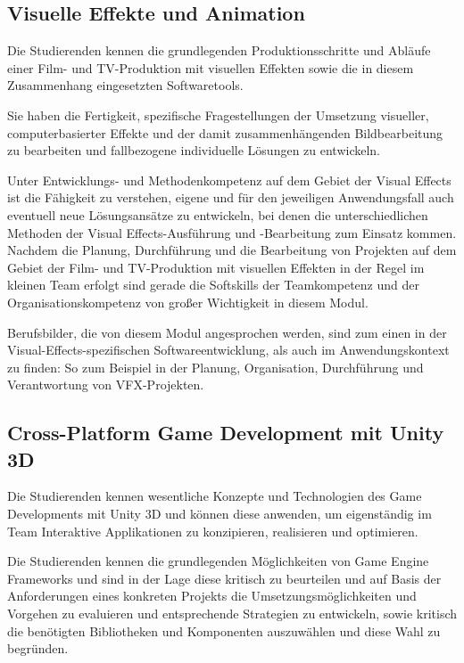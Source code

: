 \subsection*{Visuelle Effekte und
Animation}\label{visuelle-effekte-und-animation}

Die Studierenden kennen die grundlegenden Produktionsschritte und
Abläufe einer Film- und TV-Produktion mit visuellen Effekten sowie die
in diesem Zusammenhang eingesetzten Softwaretools.

Sie haben die Fertigkeit, spezifische Fragestellungen der Umsetzung
visueller, computerbasierter Effekte und der damit zusammenhängenden
Bildbearbeitung zu bearbeiten und fallbezogene individuelle Lösungen zu
entwickeln.

Unter Entwicklungs- und Methodenkompetenz auf dem Gebiet der Visual
Effects ist die Fähigkeit zu verstehen, eigene und für den jeweiligen
Anwendungsfall auch eventuell neue Lösungsansätze zu entwickeln, bei
denen die unterschiedlichen Methoden der Visual Effects-Ausführung und
-Bearbeitung zum Einsatz kommen. Nachdem die Planung, Durchführung und
die Bearbeitung von Projekten auf dem Gebiet der Film- und TV-Produktion
mit visuellen Effekten in der Regel im kleinen Team erfolgt sind gerade
die Softskills der Teamkompetenz und der Organisationskompetenz von
großer Wichtigkeit in diesem Modul.

Berufsbilder, die von diesem Modul angesprochen werden, sind zum einen
in der Visual-Effects-spezifischen Softwareentwicklung, als auch im
Anwendungskontext zu finden: So zum Beispiel in der Planung,
Organisation, Durchführung und Verantwortung von VFX-Projekten.

\subsection*{Cross-Platform Game Development mit Unity
3D}\label{cross-platform-game-development-mit-unity-3d}

Die Studierenden kennen wesentliche Konzepte und Technologien des Game
Developments mit Unity 3D und können diese anwenden, um eigenständig im
Team Interaktive Applikationen zu konzipieren, realisieren und
optimieren.

Die Studierenden kennen die grundlegenden Möglichkeiten von Game Engine
Frameworks und sind in der Lage diese kritisch zu beurteilen und auf
Basis der Anforderungen eines konkreten Projekts die
Umsetzungsmöglichkeiten und Vorgehen zu evaluieren und entsprechende
Strategien zu entwickeln, sowie kritisch die benötigten Bibliotheken und
Komponenten auszuwählen und diese Wahl zu begründen.

